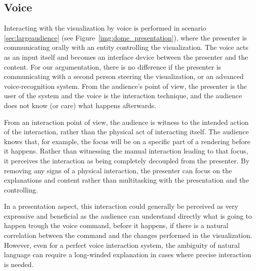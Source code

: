 \documentclass[review,journal]{vgtc}         %
\newcommand{\todo}[1]{\textbf{\textcolor{red}{[TODO: {#1}]}}}
\begin{document}



\subsection{Voice}

Interacting with the visualization by voice is performed in scenario \ref{sec:largeaudience} (see Figure~\ref{img:dome_presentation}), where the presenter is communicating orally with an entity controlling the visualization.
The voice acts as an input itself and becomes an interface device between the presenter and the content.
For our argumentation, there is no difference if the presenter is communicating with a second person steering the visualization, or an advanced voice-recognition system.
From the audience's point of view, the presenter is the user of the system and the voice is the interaction technique, and the audience does not know (or care) what happens afterwards.

From an interaction point of view, the audience is witness to the intended action of the interaction, rather than the physical act of interacting itself.
The audience knows that, for example, the focus will be on a specific part of a rendering before it happens.
Rather than witnessing the manual interaction leading to that focus, it perceives the interaction as being completely decoupled from the presenter.
By removing any signs of a physical interaction, the presenter can focus on the explanations and content rather than multitasking with the presentation and the controlling.

In a presentation aspect, this interaction could generally be perceived as very expressive and beneficial as the audience can understand directly what is going to happen trough the voice command, before it happens, if there is a natural correlation between the command and the changes performed in the visualization.
However, even for a perfect voice interaction system, the ambiguity of natural language can require a long-winded explanation in cases where precise interaction is needed.
\end{document}
